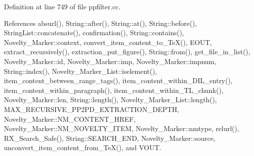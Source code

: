 Definition at line 749 of file ppfilter.cc.

References absurl(), String::after(), String::at(), String::before(), String\-List::concatenate(), confirmation(), String::contains(), Novelty\_\-Marker::context, convert\_\-item\_\-content\_\-to\_\-Te\-X(), EOUT, extract\_\-recursively(), extraction\_\-put\_\-figure(), String::from(), get\_\-file\_\-in\_\-list(), Novelty\_\-Marker::id, Novelty\_\-Marker::imp, Novelty\_\-Marker::impnum, String::index(), Novelty\_\-Marker\_\-List::iselement(), item\_\-content\_\-between\_\-range\_\-tags(), item\_\-content\_\-within\_\-DIL\_\-entry(), item\_\-content\_\-within\_\-paragraph(), item\_\-content\_\-within\_\-TL\_\-chunk(), Novelty\_\-Marker::len, String::length(), Novelty\_\-Marker\_\-List::length(), MAX\_\-RECURSIVE\_\-PP2PD\_\-EXTRACTION\_\-DEPTH, Novelty\_\-Marker::NM\_\-CONTENT\_\-HREF, Novelty\_\-Marker::NM\_\-NOVELTY\_\-ITEM, Novelty\_\-Marker::nmtype, relurl(), RX\_\-Search\_\-Safe(), String::SEARCH\_\-END, Novelty\_\-Marker::source, unconvert\_\-item\_\-content\_\-from\_\-Te\-X(), and VOUT.



